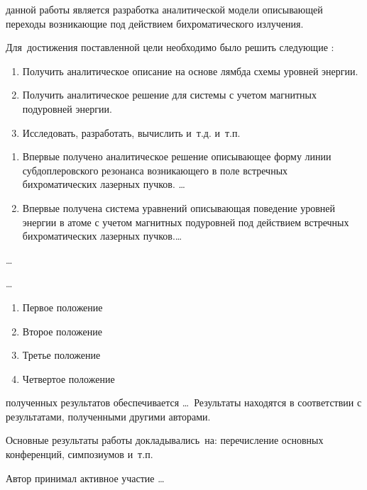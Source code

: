 {\aim} данной работы является разработка аналитической модели описывающей переходы возникающие под действием бихроматического излучения.

Для~достижения поставленной цели необходимо было решить следующие {\tasks}:
\begin{enumerate}[beginpenalty=10000] %
  \item Получить аналитическое описание на основе лямбда схемы уровней энергии.
  \item Получить аналитическое решение для системы с учетом магнитных подуровней энергии.
  \item Исследовать, разработать, вычислить и~т.\:д. и~т.\:п.
\end{enumerate}

{\novelty}
\begin{enumerate}[beginpenalty=10000] %
  \item Впервые получено аналитическое решение описывающее форму линии субдоплеровского резонанса возникающего в поле встречных бихроматических лазерных пучков. \ldots
  \item Впервые получена система уравнений описывающая поведение уровней энергии в атоме с учетом магнитных подуровней под действием встречных бихроматических лазерных пучков.\ldots
\end{enumerate}

{\influence} \ldots

{\methods} \ldots

{}
\begin{enumerate}[beginpenalty=10000] %
  \item Первое положение
  \item Второе положение
  \item Третье положение
  \item Четвертое положение
\end{enumerate}

{\reliability} полученных результатов обеспечивается \ldots \ Результаты находятся в соответствии с результатами, полученными другими авторами.


{\probation}
Основные результаты работы докладывались~на:
перечисление основных конференций, симпозиумов и~т.\:п.

{\contribution} Автор принимал активное участие \ldots

